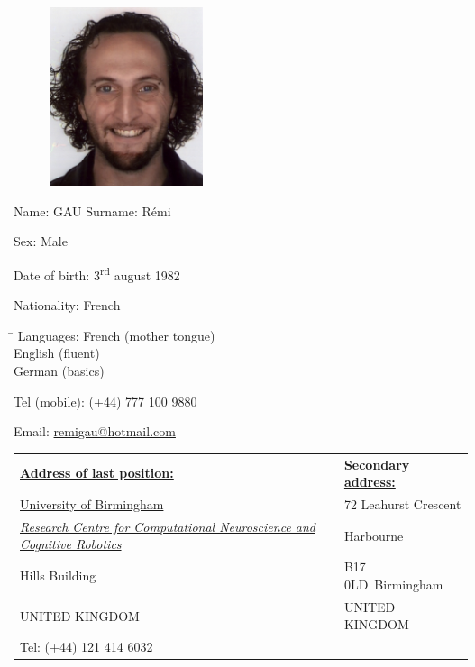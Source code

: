 \documentclass[a4paper,12pt,oneside]{letter}
\date{2011-04-12}
\begin{document}
\begin{figure}
\includegraphics[width=4.5cm]{ID0.jpg}
\end{figure}

Name: GAU \hspace{1cm} Surname: Rémi \hfill

Sex: Male

Date of birth: 3\textsuperscript{rd} august 1982

Nationality: French

\begin{tabbing}
\hspace{3cm}\=\kill
Languages:
 \> French (mother tongue)\\ 
 \> English (fluent)\\ 
 \> German (basics)\\ 
\end{tabbing}

{Tel (mobile):} (+44) 777 100 9880

{Email:} \href{mailto:remi\textunderscore gau@hotmail.com}{remi\textunderscore gau@hotmail.com}


\begin{tabular}[!h]
{p{11cm}||p{7cm}}

\underline{\textbf{Address of last position:}} 							& \underline{\textbf{Secondary address:}}\\ 
\href{http://www.birmingham.ac.uk}{University of Birmingham}						& 72 Leahurst Crescent\\
\href{http://www.birmingham.ac.uk/research/activity/cncr/index.aspx}{\textit{Research Centre for
Computational Neuroscience and Cognitive Robotics}} 							& Harbourne\\
Hills Building 												& B17 0LD Birmingham\\
UNITED KINGDOM  											& UNITED KINGDOM \\
{Tel:} (+44) 121 414 6032 										& \\
\end{tabular}
\end{document}
